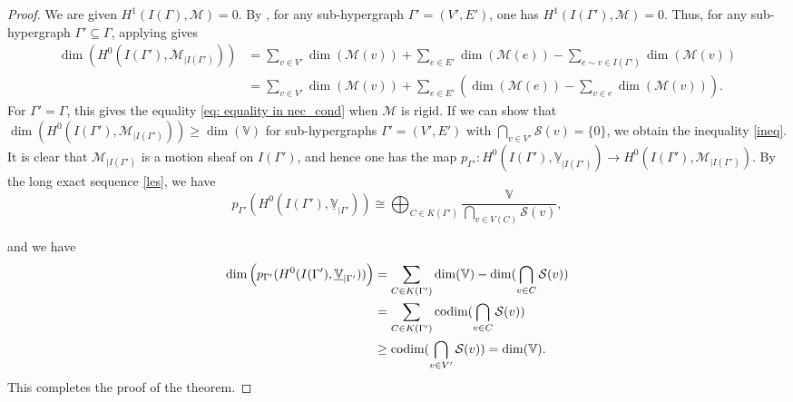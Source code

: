 \documentclass{article}
\theoremstyle{definition}
\theoremstyle{remark}
\newcommand{\codim}{\textup{codim}}
\begin{document}
\begin{proof}
We are given $H^{1}(I(\Gamma), \mathcal{M}) = 0$. By , for any sub-hypergraph $\Gamma' = (V', E')$, one has $H^{1}(I(\Gamma'), \mathcal{M}) =0$. Thus, for any sub-hypergraph $\Gamma' \subseteq \Gamma$, applying  gives
\begin{align*}
\dim\left(H^{0}(I(\Gamma'), \mathcal{M}_{\vert I(\Gamma')})\right) &= \sum_{v \in V'} \dim(\mathcal{M}(v)) + \sum_{e \in E'} \dim(\mathcal{M}(e))  -\sum_{e\sim v \in I(\Gamma')} \dim(\mathcal{M}(v))\\
&= \sum_{v \in V'} \dim(\mathcal{M}(v)) + \sum_{e \in E'} \left( \dim(\mathcal{M}(e))  -\sum_{ v \in e} \dim(\mathcal{M}(v))\right).
\end{align*}
For $\Gamma'= \Gamma$, this gives the equality \eqref{eq: equality in nec_cond} when $\mathcal{M}$ is rigid.
If we can show that $\dim\left(H^{0}(I(\Gamma'), \mathcal{M}_{\vert I(\Gamma')})\right) \geq \dim(\mathbb{V})$ for sub-hypergraphs $\Gamma' =(V', E')$ with $\bigcap_{v\in V'} \mathcal{S}(v) =\{0\}$, we obtain the inequality \eqref{ineq}. It is clear that $\mathcal{M}_{\vert I(\Gamma')}$ is a motion sheaf on $I(\Gamma')$, and hence one has the map $p_{\Gamma'}:H^{0}(I(\Gamma'), \underline{\mathbb{V}}_{\vert I(\Gamma')}) \rightarrow H^{0}(I(\Gamma'), \mathcal{M}_{\vert I(\Gamma')})$. By the long exact sequence \eqref{les}, we have $$p_{\Gamma'}(H^{0}(I(\Gamma'), \underline{\mathbb{V}}_{\vert \Gamma'})) \cong \bigoplus_{C\in K(\Gamma')}  \frac{ \mathbb{V}}{ \bigcap_{v \in V(C)} \mathcal{S}(v)},$$

and we have
\begin{align*}
\dim\left(p_{\Gamma'}(H^{0}(I(\Gamma'), \underline{\mathbb{V}}_{\vert \Gamma'}))\right) &= \sum_{C\in K(\Gamma')} \dim(\mathbb{V}) - \dim(\bigcap_{v\in C} \mathcal{S}(v))  \\
&= \sum_{C\in K(\Gamma')} \codim(\bigcap_{v\in C} \mathcal{S}(v))\\
& \geq \codim(\bigcap_{v\in V'} \mathcal{S}(v)) = \dim(\mathbb{V}).
\end{align*}
This completes the proof of the theorem.
\end{proof}
\end{document}
